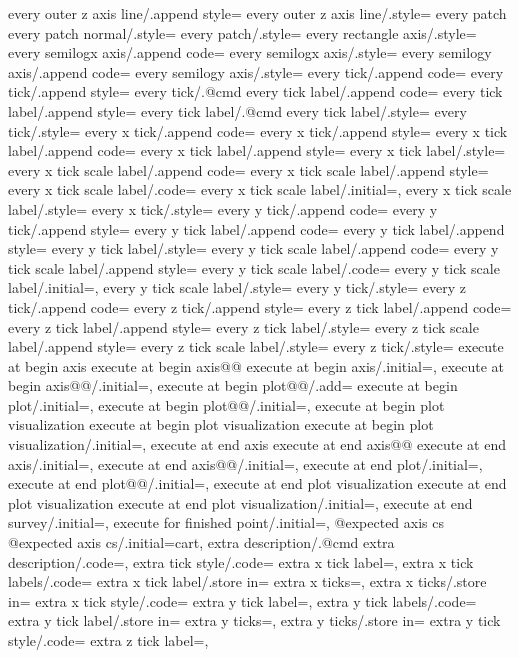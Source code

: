 {{{{{{{{{{{{{{{{{{{{{{{{{{{{{{{{{{{{{{{{{{{{{{{{{{{{{{{{{{{{{{{{{{{{{{{{{{{{{{{{{{{{{{{{{{{{{{{{{{{{{{{{{{{{{{{{{{{{{{{{{{{{{{{{{{{{{{{{{{{{{{{{{{{{{{{{{{{{{{{{{{{{{{{{{{{{{{{{{{{{{{{{{{{{{{{{{{{{{{{{{{{{{{{{{{{{{{{{{{{{{{{{{{{{{{{{{{{{{{{{{{{{{{{{{{{{{{{{{{{{{{{{{{{{{{{{{{{{{{{{{{{{{{{{{{{{{{{{{{{{{{{{{{{{{{{{{{{{{{{{{{{{{{{{{{{{{{{{{{{{{{{{every outer z axis line/.append style={
every outer z axis line/.style={
every patch
every patch normal/.style={
every patch/.style={
every rectangle axis/.style={
every semilogx axis/.append code={
every semilogx axis/.style={
every semilogy axis/.append code={
every semilogy axis/.style={
every tick/.append code={
every tick/.append style={
every tick/.@cmd
every tick label/.append code={
every tick label/.append style={
every tick label/.@cmd
every tick label/.style={
every tick/.style={
every x tick/.append code={
every x tick/.append style={
every x tick label/.append code={
every x tick label/.append style={
every x tick label/.style={
every x tick scale label/.append code={
every x tick scale label/.append style={
every x tick scale label/.code={
every x tick scale label/.initial=,
every x tick scale label/.style={
every x tick/.style={
every y tick/.append code={
every y tick/.append style={
every y tick label/.append code={
every y tick label/.append style={
every y tick label/.style={
every y tick scale label/.append code={
every y tick scale label/.append style={
every y tick scale label/.code={
every y tick scale label/.initial=,
every y tick scale label/.style={
every y tick/.style={
every z tick/.append code={
every z tick/.append style={
every z tick label/.append code={
every z tick label/.append style={
every z tick label/.style={
every z tick scale label/.append style={
every z tick scale label/.style={
every z tick/.style={
execute at begin axis
execute at begin axis@@
execute at begin axis/.initial=,
execute at begin axis@@/.initial=,
execute at begin plot@@/.add={
execute at begin plot/.initial=,
execute at begin plot@@/.initial=,
execute at begin plot visualization
execute at begin plot visualization{
execute at begin plot visualization/.initial=,
execute at end axis
execute at end axis@@
execute at end axis/.initial=,
execute at end axis@@/.initial=,
execute at end plot/.initial=,
execute at end plot@@/.initial=,
execute at end plot visualization
execute at end plot visualization{
execute at end plot visualization/.initial=,
execute at end survey/.initial=,
execute for finished point/.initial=,
@expected axis cs{
@expected axis cs/.initial=cart,
extra description/.@cmd}
extra description/.code=,
extra tick style/.code={
extra x tick label=,
extra x tick labels/.code={
extra x tick label/.store in=	
extra x ticks=,
extra x ticks/.store in=
extra x tick style/.code={
extra y tick label=,
extra y tick labels/.code={
extra y tick label/.store in=	
extra y ticks=,
extra y ticks/.store in=
extra y tick style/.code={
extra z tick label=,
}}}}}}}}}}}}}}}}}}}}}}}}}}}}}}}}}}}}}}}}}}}}}}}}}}}}}}}}}}}}}}}}}}}}}}}}}}}}}}}}}}}}}}}}}}}}}}}}}}}}}}}}}}}}}}}}}}}}}}}}}}}}}}}}}}}}}}}}}}}}}}}}}}}}}}}}}}}}}}}}}}}}}}}}}}}}}}}}}}}}}}}}}}}}}}}}}}}}}}}}}}}}}}}}}}}}}}}}}}}}}}}}}}}}}}}}}}}}}}}}}}}}}}}}}}}}}}}}}}}}}}}}}}}}}}}}}}}}}}}}}}}}}}}}}}}}}}}}}}}}}}}}}}}}}}}}}}}}}}}}}}}}}}}}}}}}}}}}}}}}}}}}}}}}}}}}}}}}}}}}}}}}}}}}}}}}}}}}}}}}}}}}}}}}}}}}}}}
